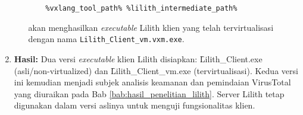 \begin{enumerate}
\begin{itemize}
\begin{listing}[H]
\begin{verbatim}
    %vxlang_tool_path% %lilith_intermediate_path%
    \end{verbatim}
    \label{lst:virtualize_lilith_example_bab4}
    \end{listing}
akan menghasilkan \textit{executable} Lilith klien yang telah tervirtualisasi dengan nama \texttt{Lilith\_Client\_vm.vxm.exe}.
\end{itemize} %
    \item \textbf{Hasil:} Dua versi \textit{executable} klien Lilith disiapkan: \f{Lilith\_Client.exe} (asli/non-virtualized) dan \f{Lilith\_Client\_vm.exe} (tervirtualisasi). Kedua versi ini kemudian menjadi subjek analisis keamanan dan pemindaian VirusTotal yang diuraikan pada Bab \ref{bab:hasil_penelitian_lilith}. Server Lilith tetap digunakan dalam versi aslinya untuk menguji fungsionalitas klien.
\end{enumerate}
